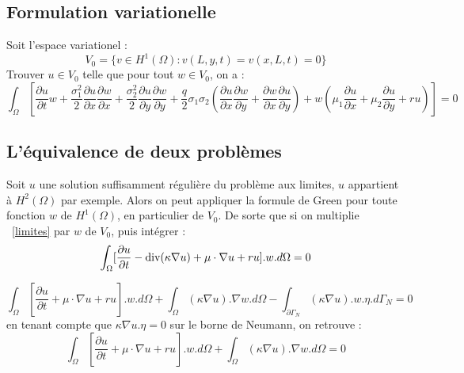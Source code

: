 \documentclass{book}
\begin{document}
\subsection*{Formulation variationelle}
Soit l'espace variationel :
		\[V_{0}=\{v\in H^{1}(\Omega):v(L,y,t)=v(x,L,t)=0\}\]
Trouver $u\in V_{0}$ telle que pour tout $w\in V_{0}$, on a :
\begin{equation}
\label{variationel}
\int_{\Omega}[\frac{\partial u}{\partial t}w+\frac{\sigma_{1}^{2}}{2}\frac{\partial u}{\partial x}\frac{\partial w}{\partial x}+\frac{\sigma_{2}^{2}}{2}\frac{\partial u}{\partial y}\frac{\partial w}{\partial y}+\frac{q}{2}\sigma_{1}\sigma_{2}(\frac{\partial u}{\partial x}\frac{\partial w}{\partial y}+\frac{\partial w}{\partial x}\frac{\partial u}{\partial y})+w(\mu_{1}\frac{\partial u}{\partial x}+\mu_{2}\frac{\partial u}{\partial y}+ru)]=0
\end{equation}


\subsection{L'équivalence de deux problèmes}
Soit $u$ une solution suffisamment régulière du problème aux limites, $u$ appartient à $H^{2}(\Omega)$ par exemple. Alors on peut appliquer la formule de Green pour toute fonction $w$ de $H^{1}(\Omega)$, en particulier de $V_{0}$. De sorte que si on multiplie ~\eqref{limites} par $w$ de $V_{0}$, puis intégrer : 
\[
\int_{\Omega}[\frac{\partial u}{\partial t}-\hbox{div}(\kappa\nabla u)+\mu\cdot\nabla u+r u].w.d\Omega = 0
\]

\[
    \int_{\Omega}[\frac{\partial u}{\partial t} +\mu\cdot\nabla u + r u].w.d\Omega +
    \int_{\Omega}(\kappa\nabla u).\nabla w.d\Omega
    -\int_{\partial \Gamma_{N}}(\kappa\nabla u). w .\eta .d\Gamma_{N} = 0
\] 
en tenant compte que $\kappa \nabla u.\eta =0$ sur le borne de Neumann, on retrouve :
\[
    \int_{\Omega}[\frac{\partial u}{\partial t} +\mu\cdot\nabla u + r u].w.d\Omega +
    \int_{\Omega}(\kappa\nabla u).\nabla w.d\Omega = 0
\] 
\end{document}
